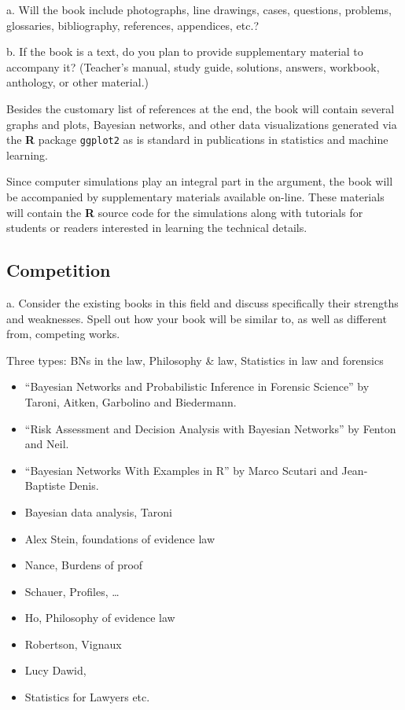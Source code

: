 \documentclass[
  10pt,
  dvipsnames,enabledeprecatedfontcommands]{scrartcl}
\begin{document}
\footnotesize a. Will the book include photographs, line drawings,
cases, questions, problems, glossaries, bibliography, references,
appendices, etc.?

\footnotesize b. If the book is a text, do you plan to provide
supplementary material to accompany it? (Teacher's manual, study guide,
solutions, answers, workbook, anthology, or other material.)

\vspace{2mm}

\normalsize

Besides the customary list of references at the end, the book will
contain several graphs and plots, Bayesian networks, and other data
visualizations generated via the \textbf{\textsf{R}} package
\texttt{ggplot2} as is standard in publications in statistics and
machine learning.

Since computer simulations play an integral part in the argument, the
book will be accompanied by supplementary materials available on-line.
These materials will contain the \textbf{\textsf{R}} source code for the
simulations along with tutorials for students or readers interested in
learning the technical details.

\hypertarget{competition}{%
\subsection{Competition}\label{competition}}

\footnotesize a. Consider the existing books in this field and discuss
specifically their strengths and weaknesses. Spell out how your book
will be similar to, as well as different from, competing works.


\normalsize

Three types: BNs in the law, Philosophy \& law, Statistics in law and
forensics

\begin{itemize}
\item
  ``Bayesian Networks and Probabilistic Inference in Forensic Science''
  by Taroni, Aitken, Garbolino and Biedermann.
\item
  ``Risk Assessment and Decision Analysis with Bayesian Networks'' by
  Fenton and Neil.
\item
  ``Bayesian Networks With Examples in R'' by Marco Scutari and
  Jean-Baptiste Denis.
\item
  Bayesian data analysis, Taroni
\item
  Alex Stein, foundations of evidence law
\item
  Nance, Burdens of proof
\item
  Schauer, Profiles, \dots
\item
  Ho, Philosophy of evidence law
\item
  Robertson, Vignaux
\item
  Lucy Dawid,
\item
  Statistics for Lawyers etc.
\end{itemize}
\end{document}

